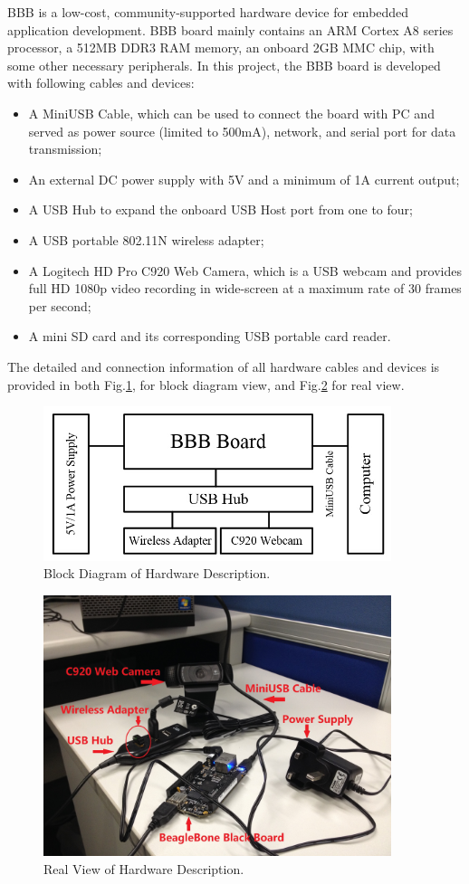 \documentclass[13pt,journal,draftclsnofoot,onecolumn]{IEEEtran}
\begin{document}
BBB is a low-cost, community-supported hardware device for embedded application development. BBB board mainly contains an ARM Cortex A8 series processor, a 512MB DDR3 RAM memory, an onboard 2GB MMC chip, with some other necessary peripherals. In this project, the BBB board is developed with following cables and devices: 
\begin{itemize}
\item A MiniUSB Cable, which can be used to connect the board with PC and served as power source (limited to 500mA), network, and serial port for data transmission;
\item An external DC power supply with 5V and a minimum of 1A current output;
\item A USB Hub to expand the onboard USB Host port from one to four;
\item A USB portable 802.11N wireless adapter;
\item A Logitech HD Pro C920 Web Camera, which is a USB webcam and provides full HD 1080p video recording in wide-screen at a maximum rate of 30 frames per second;
\item A mini SD card and its corresponding USB portable card reader.
\end{itemize}
The detailed and connection information of all hardware cables and devices is provided in both Fig.\ref{hw1}, for block diagram view, and Fig.\ref{hw2} for real view.
\begin{figure}[ht]
	\centering
	\includegraphics[width=4in]{./figs/hw1.jpg}
	\caption{Block Diagram of Hardware Description.}
	\label{hw1}
\end{figure}
\begin{figure}[ht]
	\centering
	\includegraphics[width=4in]{./figs/hw2.jpg}
	\caption{Real View of Hardware Description.}
	\label{hw2}
\end{figure}
\end{document}
